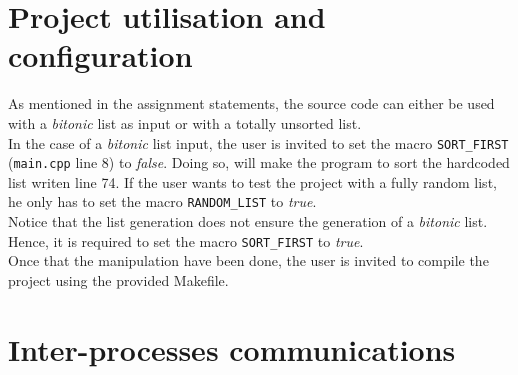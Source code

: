 \documentclass[a4paper,11pt]{article}
\begin{document}
\section{Project utilisation and configuration}

  As mentioned in the assignment statements, the source code can either be used with a \textit{bitonic} list as input or with a totally unsorted list.\\
  In the case of a \textit{bitonic} list input, the user is invited to set the macro \verb|SORT_FIRST| (\verb|main.cpp| line 8) to \textit{false}. Doing so, will make the program to sort the hardcoded list writen line 74. If the user wants to test the project with a fully random list, he only has to set the macro \verb|RANDOM_LIST| to \textit{true}.\\
  Notice that the list generation does not ensure the generation of a \textit{bitonic} list. Hence, it is required to set the macro \verb|SORT_FIRST| to \textit{true}.\\
  Once that the manipulation have been done, the user is invited to compile the project using the provided Makefile.

\section{Inter-processes communications}
\end{document}
